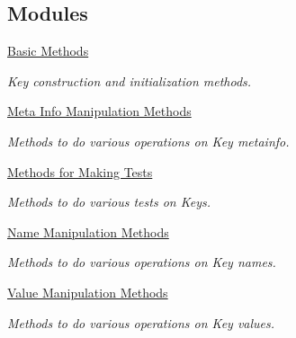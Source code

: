 \subsection*{Modules}
\begin{DoxyCompactItemize}
\item 
\hyperlink{group__key__basic}{Basic Methods}
\begin{DoxyCompactList}\small\item\em Key construction and initialization methods. \end{DoxyCompactList}\item 
\hyperlink{group__keymeta}{Meta Info Manipulation Methods}
\begin{DoxyCompactList}\small\item\em Methods to do various operations on Key metainfo. \end{DoxyCompactList}\item 
\hyperlink{group__keytest}{Methods for Making Tests}
\begin{DoxyCompactList}\small\item\em Methods to do various tests on Keys. \end{DoxyCompactList}\item 
\hyperlink{group__keyname}{Name Manipulation Methods}
\begin{DoxyCompactList}\small\item\em Methods to do various operations on Key names. \end{DoxyCompactList}\item 
\hyperlink{group__keyvalue}{Value Manipulation Methods}
\begin{DoxyCompactList}\small\item\em Methods to do various operations on Key values. \end{DoxyCompactList}\end{DoxyCompactItemize}
